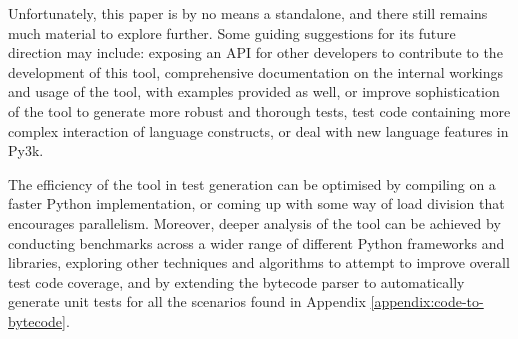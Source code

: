 \documentclass{icldt}
\numberwithin{equation}{section}       %
\newcommand{\blankpage}{
\newpage
\thispagestyle{empty}
\mbox{}
\newpage
}
\begin{document}
{{Unfortunately, this paper is by no means a standalone, and there still remains much material to explore further. Some guiding suggestions for its future direction may include: exposing an API for other developers to contribute to the development of this tool, comprehensive documentation on the internal workings and usage of the tool, with examples provided as well, or improve sophistication of the tool to generate more robust and thorough tests, test code containing more complex interaction of language constructs, or deal with new language features in Py3k.

The efficiency of the tool in test generation can be optimised by compiling on a faster Python implementation, or coming up with some way of load division that encourages parallelism. Moreover, deeper analysis of the tool can be achieved by conducting benchmarks across a wider range of different Python frameworks and libraries, exploring other techniques and algorithms to attempt to improve overall test code coverage, and by extending the bytecode parser to automatically generate unit tests for all the scenarios found in Appendix \ref{appendix:code-to-bytecode}.


\nocite{*}

\appendix
}}
\end{document}
